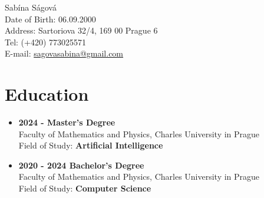 \documentclass[a4paper,12pt]{article}
\begin{document}
\begin{center}
    {\LARGE Sabína Ságová} \\[0.2cm]
    \small Date of Birth: 06.09.2000 \\
    Address: Sartoriova 32/4, 169 00 Prague 6 \\
    Tel: (+420) 773025571 \\
    E-mail: \href{mailto:sagovasabina@gmail.com}{sagovasabina@gmail.com}
\end{center}

\renewcommand{\thefootnote}{}
\renewcommand{\thefootnote}{\arabic{footnote}} %

\vspace{0.8cm} %

\section*{Education}
\begin{itemize}[left=0pt, label={}]\setlength\itemsep{4pt} %
    \item \textbf{2024 - Master's Degree} \\
    Faculty of Mathematics and Physics, Charles University in Prague \\
    Field of Study: \textbf{Artificial Intelligence}

    \item \textbf{2020 - 2024 Bachelor's Degree} \\
    Faculty of Mathematics and Physics, Charles University in Prague \\
    Field of Study: \textbf{Computer Science}

\end{itemize}
\end{document}
